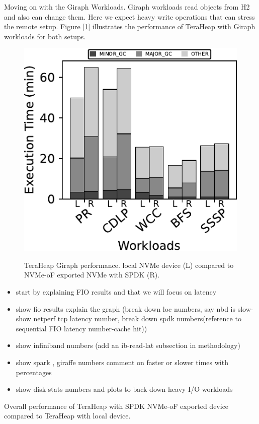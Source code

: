 \par Moving on with the Giraph Workloads. Giraph workloads read objects from H2 and also can change them. Here we expect heavy write operations that can stress the remote setup. Figure [\ref{fig:bench_giraph}] illustrates the performance of TeraHeap with Giraph workloads for both setups.
\begin{figure}[H]
  \includegraphics[width=\linewidth]{asplos25-Thesis/figures/bench_giraph.pdf}\\
\caption{TeraHeap Giraph performance. local NVMe device (L) compared to NVMe-oF exported NVMe with SPDK (R).}
\label{fig:bench_giraph}
\end{figure}

\begin{itemize}
    \item start by explaining FIO results and that we will focus on latency
    \item show fio results explain the graph (break down loc numbers, say nbd is slow-show netperf tcp latency number, break down spdk numbers(reference to sequential FIO latency number-cache hit))
    \item show infiniband numbers (add an ib-read-lat subsection in methodology)
    \item show spark , giraffe numbers comment on faster or slower times with percentages
    \item show disk stats numbers and plots to back down heavy I/O workloads
\end{itemize}

Overall performance of TeraHeap with SPDK NVMe-oF exported device compared to TeraHeap with local device.